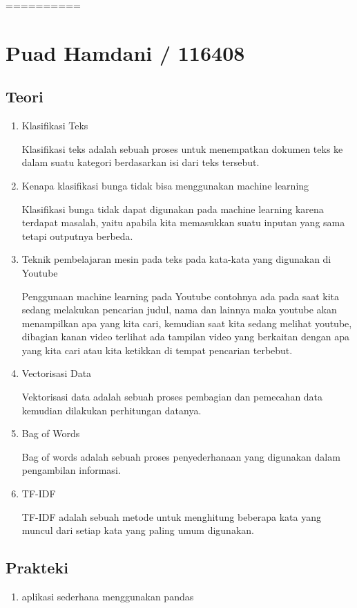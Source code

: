==========

\section{Puad Hamdani / 116408}
\subsection{Teori}
\begin{enumerate}
\item Klasifikasi Teks
\par
Klasifikasi teks adalah sebuah proses untuk menempatkan dokumen teks ke dalam suatu kategori berdasarkan isi dari teks tersebut. 
\item Kenapa klasifikasi bunga tidak bisa menggunakan machine learning
\par
Klasifikasi bunga tidak dapat digunakan pada machine learning karena terdapat masalah, yaitu apabila kita memasukkan suatu inputan yang sama tetapi outputnya berbeda.
\item  Teknik pembelajaran mesin pada teks pada kata-kata yang digunakan di Youtube
\par
Penggunaan machine learning pada Youtube contohnya ada pada saat kita sedang melakukan pencarian judul, nama dan lainnya maka youtube akan menampilkan apa yang kita cari, kemudian saat kita sedang melihat youtube, dibagian kanan video terlihat ada tampilan video yang berkaitan dengan apa yang kita cari atau kita ketikkan di tempat pencarian terbebut.
\item Vectorisasi Data
\par
Vektorisasi data adalah sebuah proses pembagian dan pemecahan data kemudian dilakukan perhitungan datanya.
\item Bag of Words
\par
Bag of words adalah sebuah proses penyederhanaan yang digunakan dalam pengambilan informasi.
\item TF-IDF
\par
TF-IDF adalah sebuah metode untuk menghitung beberapa kata yang muncul dari setiap kata yang paling umum digunakan.

\end{enumerate}

\subsection{Prakteki}
\begin{enumerate}
\item aplikasi sederhana menggunakan pandas
\par


\end{enumerate}